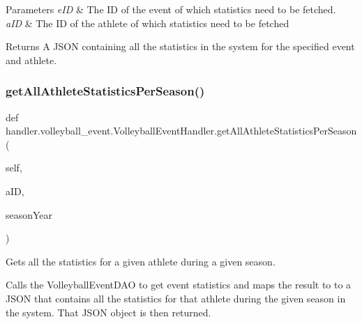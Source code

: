 \begin{DoxyParams}{Parameters}
{\em e\+ID} & The ID of the event of which statistics need to be fetched. \\
\hline
{\em a\+ID} & The ID of the athlete of which statistics need to be fetched\\
\hline
\end{DoxyParams}
\begin{DoxyReturn}{Returns}
A J\+S\+ON containing all the statistics in the system for the specified event and athlete. 
\end{DoxyReturn}
\mbox{\label{classhandler_1_1volleyball__event_1_1_volleyball_event_handler_a7a57d2413855350d72d5650f568d0688}} 
\subsubsection{\texorpdfstring{get\+All\+Athlete\+Statistics\+Per\+Season()}{getAllAthleteStatisticsPerSeason()}}
{\footnotesize\ttfamily def handler.\+volleyball\+\_\+event.\+Volleyball\+Event\+Handler.\+get\+All\+Athlete\+Statistics\+Per\+Season (\begin{DoxyParamCaption}\item[{}]{self,  }\item[{}]{a\+ID,  }\item[{}]{season\+Year }\end{DoxyParamCaption})}



Gets all the statistics for a given athlete during a given season. 

Calls the Volleyball\+Event\+D\+AO to get event statistics and maps the result to to a J\+S\+ON that contains all the statistics for that athlete during the given season in the system. That J\+S\+ON object is then returned.


